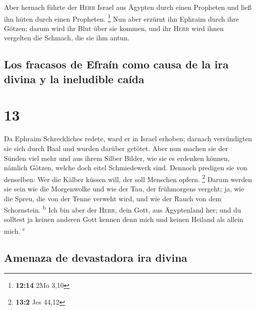  Aber hernach führte der \textsc{Herr} Israel aus Ägypten
durch einen Propheten und ließ ihn hüten durch einen Propheten.
\footnote{\textbf{12:14} 2Mo 3,10}  Nun aber erzürnt ihn
Ephraim durch ihre Götzen; darum wird ihr Blut über sie kommen, und ihr
\textsc{Herr} wird ihnen vergelten die Schmach, die sie ihm antun.

\hypertarget{los-fracasos-de-efrauxedn-como-causa-de-la-ira-divina-y-la-ineludible-cauxedda}{%
\subsection{Los fracasos de Efraín como causa de la ira divina y la
ineludible
caída}\label{los-fracasos-de-efrauxedn-como-causa-de-la-ira-divina-y-la-ineludible-cauxedda}}

\hypertarget{section-12}{%
\section{13}\label{section-12}}

 Da Ephraim Schreckliches redete, ward er in Israel
erhoben; darnach versündigten sie sich durch Baal und wurden darüber
getötet.  Aber nun machen sie der Sünden viel mehr und aus
ihrem Silber Bilder, wie sie es erdenken können, nämlich Götzen, welche
doch eitel Schmiedewerk sind. Dennoch predigen sie von denselben: Wer
die Kälber küssen will, der soll Menschen opfern. \footnote{\textbf{13:2}
  Jes 44,12}  Darum werden sie sein wie die Morgenwolke
und wie der Tau, der frühmorgens vergeht; ja, wie die Spreu, die von der
Tenne verweht wird, und wie der Rauch von dem Schornstein.
\textsuperscript{b}  Ich bin aber der \textsc{Herr}, dein
Gott, aus Ägyptenland her; und du solltest ja keinen anderen Gott kennen
denn mich und keinen Heiland als allein mich. \textsuperscript{c}

\hypertarget{amenaza-de-devastadora-ira-divina}{%
\subsection{Amenaza de devastadora ira
divina}\label{amenaza-de-devastadora-ira-divina}}

